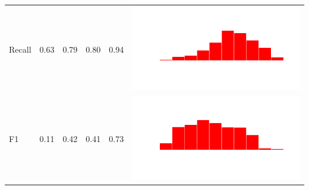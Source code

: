 \begin{table}
\begin{tabular}{lrrrrc}
    Recall & 0.63 & 0.79 & 0.80 & 0.94 & \includegraphics[scale = 0.1, clip = true, trim= 50px 60px 50px 60px]{../figs/hist-results/hist-NBrec.pdf} \\
    F1 & 0.11 & 0.42 & 0.41 & 0.73 & \includegraphics[scale = 0.1, clip = true, trim= 50px 60px 50px 60px]{../figs/hist-results/hist-NBf1.pdf} \\


\end{tabular}
\end{table}
